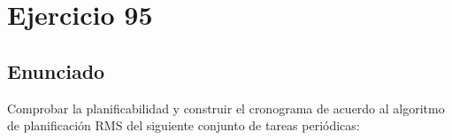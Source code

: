 \documentclass[a4paper,12pt]{article}
\begin{document}






\section{Ejercicio 95}
\subsection{Enunciado}
Comprobar la planificabilidad y construir el cronograma de acuerdo al algoritmo de planificación RMS del siguiente conjunto de tareas periódicas:
\end{document}
